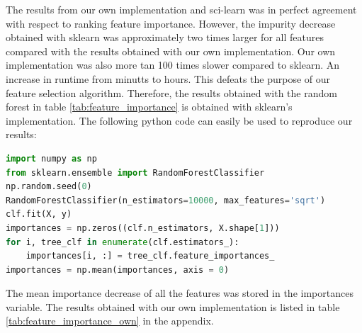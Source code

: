 The results from our own implementation and sci-learn was in perfect agreement
with respect to ranking feature importance. 
However, the impurity decrease obtained with sklearn was
approximately two times larger for all features compared with the results obtained with our own
implementation. Our own implementation was also more tan 100 times slower
compared to
sklearn. An increase in runtime from minutts to hours. This defeats the purpose
of our feature selection algorithm. 
Therefore, the results obtained with the random forest in table
\ref{tab:feature_importance}  is obtained with sklearn's implementation. 
The following python code can easily
be used to reproduce our results:  
\begin{lstlisting}[language=Python]
import numpy as np 
from sklearn.ensemble import RandomForestClassifier
np.random.seed(0)
RandomForestClassifier(n_estimators=10000, max_features='sqrt')
clf.fit(X, y)
importances = np.zeros((clf.n_estimators, X.shape[1]))
for i, tree_clf in enumerate(clf.estimators_): 
    importances[i, :] = tree_clf.feature_importances_
importances = np.mean(importances, axis = 0)
\end{lstlisting}
The mean importance decrease of all the features was stored in the importances
variable. The results obtained with our own implementation is listed in table
\ref{tab:feature_importance_own} in the appendix. 












































